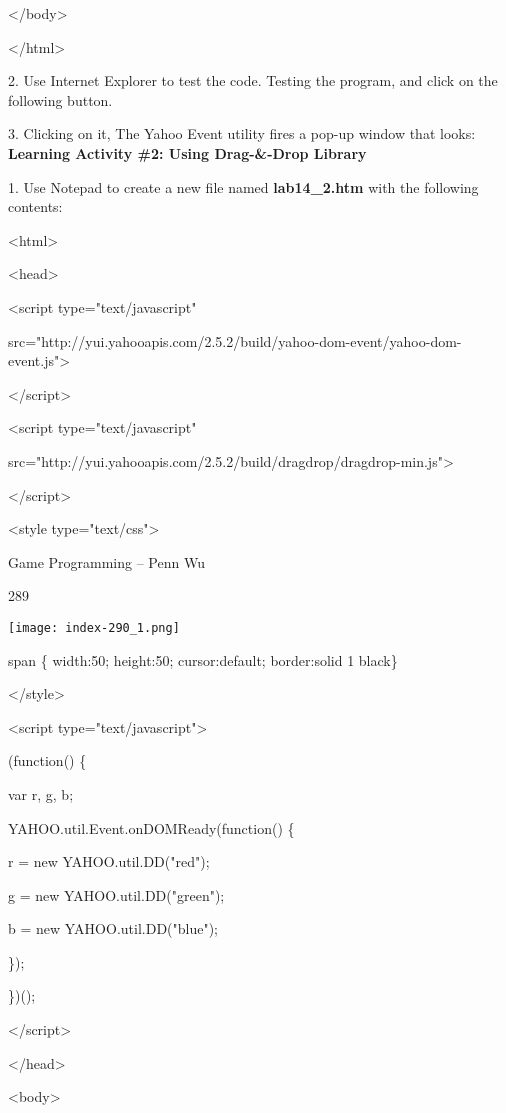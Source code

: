 \documentclass[
]{article}
\begin{document}
\textless/body\textgreater{}

\textless/html\textgreater{}

2. Use Internet Explorer to test the code. Testing the program, and
click on the following button.

3. Clicking on it, The Yahoo Event utility fires a pop-up window that
looks: \textbf{Learning Activity \#2: Using Drag-\&-Drop Library}

1. Use Notepad to create a new file named \textbf{lab14\_2.htm} with the
following contents:

\textless html\textgreater{}

\textless head\textgreater{}

\textless script type="text/javascript"

src="http://yui.yahooapis.com/2.5.2/build/yahoo-dom-event/yahoo-dom-event.js"\textgreater{}

\textless/script\textgreater{}

\textless script type="text/javascript"

src="http://yui.yahooapis.com/2.5.2/build/dragdrop/dragdrop-min.js"\textgreater{}

\textless/script\textgreater{}

\textless style type="text/css"\textgreater{}

Game Programming -- Penn Wu

289

\protect\hypertarget{index_split_015.htmlux5cux23p290}{}{}\texttt{[image: index-290\_1.png]}

span \{ width:50; height:50; cursor:default; border:solid 1 black\}

\textless/style\textgreater{}

\textless script type="text/javascript"\textgreater{}

(function() \{

var r, g, b;

YAHOO.util.Event.onDOMReady(function() \{

r = new YAHOO.util.DD("red");

g = new YAHOO.util.DD("green");

b = new YAHOO.util.DD("blue");

\});

\})();

\textless/script\textgreater{}

\textless/head\textgreater{}

\textless body\textgreater{}
\end{document}
